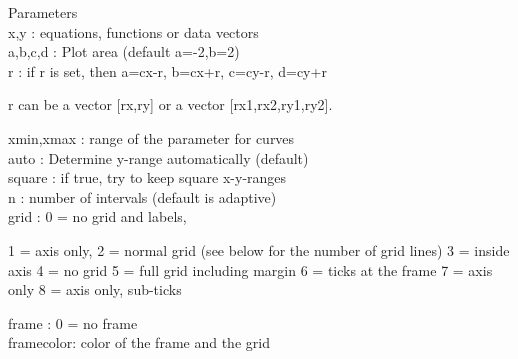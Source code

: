 \documentclass[a4paper,10pt]{article}
\begin{document}
\begin{eulernotebook}
\begin{eulercomment}
\begin{eulercomment}
\begin{eulercomment}
\begin{eulercomment}
\begin{eulercomment}
\begin{eulercomment}
\begin{eulercomment}
\begin{eulercomment}
\begin{eulercomment}
\begin{eulercomment}
\begin{eulercomment}
\begin{eulercomment}
\begin{eulercomment}
\begin{eulercomment}
\begin{eulercomment}
\begin{eulercomment}
\begin{eulercomment}
\begin{eulercomment}
\begin{eulercomment}
\begin{eulercomment}
\begin{eulercomment}
\begin{eulercomment}
\begin{eulercomment}
\begin{eulercomment}
\begin{eulercomment}
\begin{eulercomment}
\begin{eulercomment}
\begin{eulercomment}
\begin{eulercomment}
\begin{eulercomment}
\begin{eulercomment}
\begin{eulercomment}
\begin{eulercomment}
\begin{eulercomment}
\begin{eulercomment}
\begin{eulercomment}
\begin{eulercomment}
Parameters
\\
x,y       : equations, functions or data vectors\\
a,b,c,d   : Plot area (default a=-2,b=2)\\
r         : if r is set, then a=cx-r, b=cx+r, c=cy-r, d=cy+r\\
\end{eulercomment}
\begin{eulerttcomment}
            r can be a vector [rx,ry] or a vector [rx1,rx2,ry1,ry2].
\end{eulerttcomment}
\begin{eulercomment}
xmin,xmax : range of the parameter for curves\\
auto      : Determine y-range automatically (default)\\
square    : if true, try to keep square x-y-ranges\\
n         : number of intervals (default is adaptive)\\
grid      : 0 = no grid and labels,\\
\end{eulercomment}
\begin{eulerttcomment}
            1 = axis only,
            2 = normal grid (see below for the number of grid lines)
            3 = inside axis
            4 = no grid
            5 = full grid including margin
            6 = ticks at the frame
            7 = axis only
            8 = axis only, sub-ticks
\end{eulerttcomment}
\begin{eulercomment}
frame     : 0 = no frame\\
framecolor: color of the frame and the grid\\

\end{eulercomment}
\end{eulercomment}
\end{eulercomment}
\end{eulercomment}
\end{eulercomment}
\end{eulercomment}
\end{eulercomment}
\end{eulercomment}
\end{eulercomment}
\end{eulercomment}
\end{eulercomment}
\end{eulercomment}
\end{eulercomment}
\end{eulercomment}
\end{eulercomment}
\end{eulercomment}
\end{eulercomment}
\end{eulercomment}
\end{eulercomment}
\end{eulercomment}
\end{eulercomment}
\end{eulercomment}
\end{eulercomment}
\end{eulercomment}
\end{eulercomment}
\end{eulercomment}
\end{eulercomment}
\end{eulercomment}
\end{eulercomment}
\end{eulercomment}
\end{eulercomment}
\end{eulercomment}
\end{eulercomment}
\end{eulercomment}
\end{eulercomment}
\end{eulercomment}
\end{eulercomment}
\end{eulernotebook}
\end{document}
